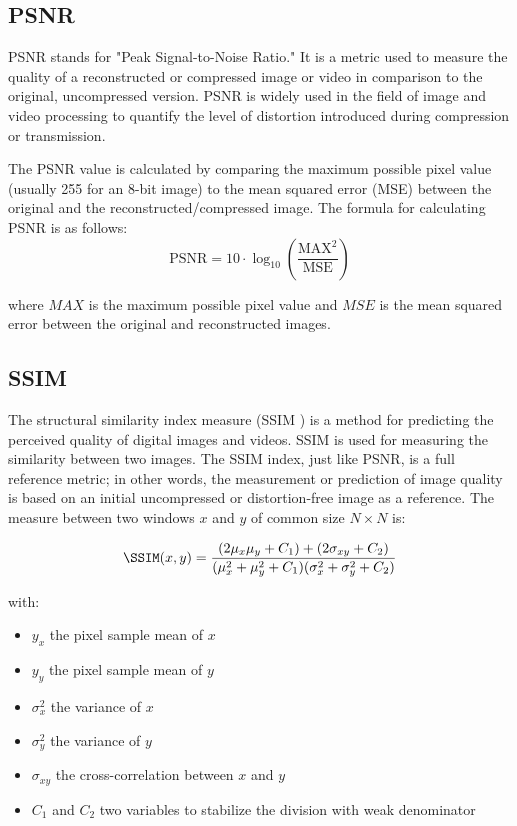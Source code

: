 \subsection{PSNR}
\label{subsec:psnr}
  PSNR \cite{psnr} stands for "Peak Signal-to-Noise Ratio." It is a metric used to measure the quality of a reconstructed or compressed image or video in comparison to the original, uncompressed version. PSNR is widely used in the field of image and video processing to quantify the level of distortion introduced during compression or transmission.

  The PSNR value is calculated by comparing the maximum possible pixel value (usually 255 for an 8-bit image) to the mean squared error (MSE) between the original and the reconstructed/compressed image. The formula for calculating PSNR is as follows:
  \[
  \text{PSNR} = 10 \cdot \log_{10}\left(\frac{\text{MAX}^2}{\text{MSE}}\right)
  \]

  where \(MAX\) is the maximum possible pixel value and \(MSE\) is the mean squared error between the original and reconstructed images.

\subsection{SSIM}
\label{subsec:ssim}
  The structural similarity index measure (SSIM \cite{ssim}) is a method for predicting the perceived quality of digital images and videos. SSIM is used for measuring the similarity between two images. The SSIM index, just like PSNR, is a full reference metric; in other words, the measurement or prediction of image quality is based on an initial uncompressed or distortion-free image as a reference. The measure between two windows \(x\) and \(y\) of common size \(N \times N\) is:


  \begin{equation}
    \SSIM(x,y) = \frac{(2\mu_x\mu_y + C_1) + (2 \sigma _{xy} + C_2)}
      {(\mu_x^2 + \mu_y^2+C_1) (\sigma_x^2 + \sigma_y^2+C_2)}
    \label{eq:SSMI}
  \end{equation}

  with:
  \begin{itemize}
    \itemsep0em
    \item \(y_x\) the pixel sample mean of \(x\)
    \item \(y_y\) the pixel sample mean of \(y\)
    \item \(\sigma_x^2\) the variance of \(x\)
    \item \(\sigma_y^2\) the variance of \(y\)
    \item \(\sigma _{xy}\) the cross-correlation between \(x\) and \(y\)
    \item \(C_1\) and \(C_2\) two variables to stabilize the division with weak denominator
  \end{itemize}

